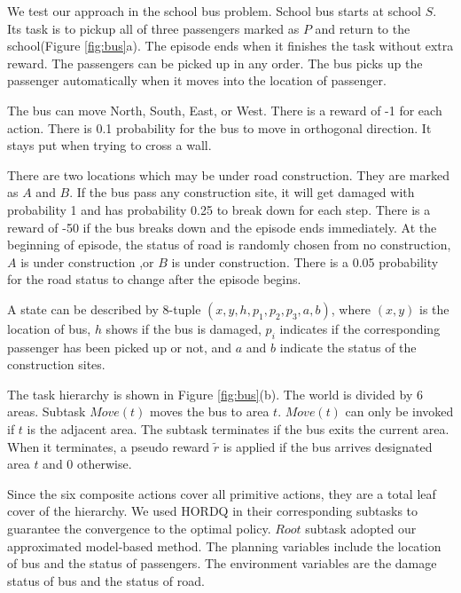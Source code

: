 \documentclass{article} %
\begin{document}
We test our approach in the school bus problem. School bus starts at school $S$. Its task 
is to pickup all of three passengers marked as $P$ and return to the school(Figure \ref{fig:bus}a).
The episode ends when it finishes the task without extra reward. 
The passengers can be picked up in any order. The bus picks up the passenger automatically when it moves into
the location of passenger.

The bus can move North, South, East, or West. There is a reward of -1 for each action.
There is 0.1 probability for the bus to move in orthogonal direction. It stays put 
when trying to cross a wall. 

There are two locations which may be under road construction. They are marked as 
$A$ and $B$. If the bus pass any construction site, it will get damaged with probability 1 and has probability
0.25 to break down for each step. There is a reward of -50 if the bus breaks down and the episode ends immediately. 
At the beginning of episode, the status of road is randomly chosen from no construction, $A$ is under construction
,or $B$ is under construction. There is a 0.05 probability for the road status to change after the episode begins.


A state can be described by 8-tuple $(x, y, h, p_1, p_2, p_3, a, b)$, where $(x, y)$ is the location of 
bus, $h$ shows if the bus is damaged, $p_i$ indicates if the corresponding passenger has been picked up or not,
and $a$ and $b$ indicate the status of the construction sites.

The task hierarchy is shown in Figure \ref{fig:bus}(b). 
The world is divided by 6 areas. Subtask $Move(t)$ moves the bus to area $t$. 
$Move(t)$ can only be invoked if $t$ is the adjacent area.
The subtask terminates if the bus exits the current area.
When it terminates, a pseudo reward $\tilde{r}$ is applied if the bus arrives designated area $t$ and 0 otherwise.

Since the six composite actions cover all primitive actions, they are a total leaf cover of the hierarchy.
We used HORDQ in their corresponding subtasks to guarantee the convergence to the optimal
policy. $Root$ subtask adopted our approximated model-based method. The planning variables include 
the location of bus and the status of passengers. The environment variables are the 
damage status of bus and the status of road. 
\end{document}
